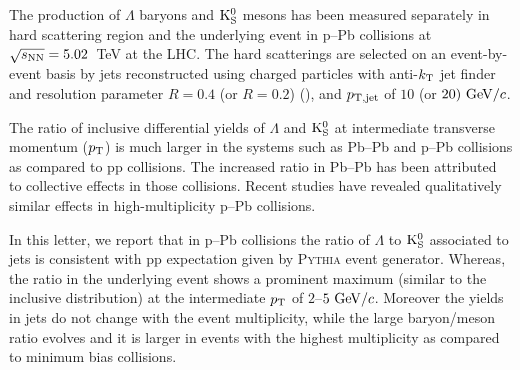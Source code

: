The production of $\Lambda$ baryons and ${\rm K}_{\rm S}^{0}$ mesons has been measured separately in hard scattering region and the underlying event in p--Pb collisions at $\sqrt{s_{\rm NN}}=5.02$~TeV at the LHC.
The hard scatterings are selected on an event-by-event basis by jets reconstructed using charged particles with anti-$k_{\rm T}$ jet finder and resolution parameter $R=0.4$ (or $R=0.2$) (), and $\pT[jet]$ of $10$ (or $20)~{\rm GeV/}c$.

The ratio of inclusive differential yields of $\Lambda$ and ${\rm K}_{\rm S}^{0}$ at intermediate transverse momentum ($\pT$) is much larger in the systems such as Pb--Pb and p--Pb collisions as compared to pp collisions.
The increased ratio in Pb--Pb has been attributed to collective effects in those collisions.
Recent studies have revealed qualitatively similar effects in high-multiplicity p--Pb collisions.

In this letter, we report that in p--Pb collisions the ratio of $\Lambda$ to ${\rm K}_{\rm S}^{0}$ associated to jets is consistent with pp expectation given by \textsc{Pythia} event generator.
Whereas, the ratio in the underlying event shows a prominent maximum (similar to the inclusive distribution) at the intermediate $\pT$ of $2$--$5~{\rm GeV/}c$.
Moreover the yields in jets do not change with the event multiplicity, while the large baryon/meson ratio evolves and it is larger in events with the highest multiplicity as compared to minimum bias collisions.
